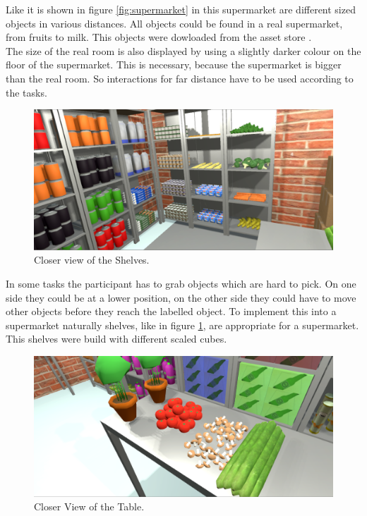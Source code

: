 Like it is shown in figure \ref{fig:supermarket} in this supermarket are different sized objects in various distances. All objects could be found in a real supermarket, from fruits to milk. This objects were dowloaded from the asset store \cite{asset_food1} \cite{asset_food2} \cite{asset_box}. \\
The size of the real room is also displayed by using a slightly darker colour on the floor of the supermarket. This is necessary, because the supermarket is bigger than the real room. So interactions for far distance have to be used according to the tasks.

\begin{figure}[H] 
	\center 
	\includegraphics[width=12cm]{Images/supermarket2.PNG}
	\caption[Closer View of the Shelves.]{Closer view of the Shelves.}
	\label{fig:shelve}
\end{figure}

In some tasks the participant has to grab objects which are hard to pick. On one side they could be at a lower position, on the other side they could have to move other objects before they reach the labelled object. To implement this into a supermarket naturally shelves, like in figure \ref{fig:shelve}, are appropriate for a supermarket. This shelves were build with different scaled cubes.

\begin{figure}[H] 
	\center 
	\includegraphics[width=12cm]{Images/supermarket1.PNG}
	\caption[Closer View of the Table.]{Closer View of the Table.}
	\label{fig:table}
\end{figure}	

